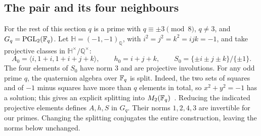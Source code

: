 \subsection{The pair and its four neighbours}
For the rest of this section $q$ is a prime with $q\equiv\pm3\pmod8$,
$q\ne3$, and $G_q=\operatorname{PGL}_2(\mathbb{F}_q)$.
Let $\mathbb H=(-1,-1)_{\mathbb Q}$, with $i^2=j^2=k^2=ijk=-1$,
and take projective classes in $\mathbb H^\times/\mathbb Q^\times$:
\[
 A_0=\langle i,1+i,1+i+j+k\rangle,\qquad h_0=i+j+k,
 \qquad S_0=\{\pm i\pm j\pm k\}/\{\pm1\}.
\]
The four elements of $S_0$ have norm $3$ and are projective involutions.
For any odd prime $q$, the quaternion algebra over $\mathbb{F}_q$ is split.
Indeed, the two sets of squares and of $-1$ minus squares have more
than $q$ elements in total, so $x^2+y^2=-1$ has a solution; this gives
an explicit splitting into $M_2(\mathbb{F}_q)$~\cite[Proposition 2.5.2]{DSV2003}.
Reducing the indicated projective elements defines $A,h,S$ in $G_q$.
Their norms $1,2,4,3$ are invertible for our primes. Changing the splitting
conjugates the entire construction, leaving the norms below unchanged.


